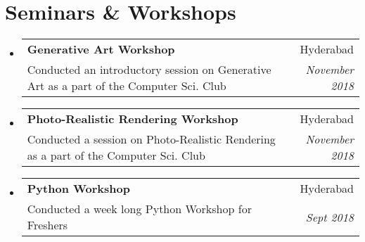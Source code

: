\documentclass[a4paper,11pt]{article}
\makeatletter
\newcommand{\resumeSubheading}[4]{
    \item
        \begin{tabular*}{0.97\textwidth}{l@{\extracolsep{\fill}}r}
            \textbf{#1} & #2 \\
            \small#3 & \textit{\small #4} \\
        \end{tabular*}\vspace{-5pt}
}
\newcommand{\resumeSubHeadingListStart}{\begin{itemize}[leftmargin=*]}
\newcommand{\resumeSubHeadingListEnd}{\end{itemize}}
\makeatother
\begin{document}
{{%

\section{Seminars \& Workshops}
    \resumeSubHeadingListStart
        \resumeSubheading
            {Generative Art Workshop}{Hyderabad}
            {Conducted an introductory session on Generative Art as a part of the Computer Sci. Club}{November 2018}
        \resumeSubheading
            {Photo-Realistic Rendering Workshop}{Hyderabad}
            {Conducted a session on Photo-Realistic Rendering as a part of the Computer Sci. Club}{November 2018}
        \resumeSubheading
            {Python Workshop}{Hyderabad}
            {Conducted a week long Python Workshop for Freshers}{Sept 2018}
    \resumeSubHeadingListEnd

}}
\end{document}

